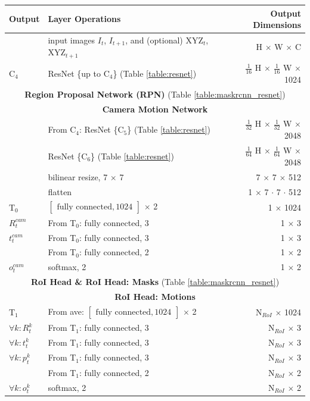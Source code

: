 {\begin{table}[h]
\centering
\begin{tabular}{llr}
\toprule
\textbf{Output} & \textbf{Layer Operations} & \textbf{Output Dimensions} \\
\midrule\midrule
& input images $I_t$, $I_{t+1}$, and (optional) XYZ$_{t}$, XYZ$_{t+1}$ & H $\times$ W $\times$ C \\
\midrule
C$_4$ & ResNet \{up to C$_4$\} (Table \ref{table:resnet}) & $\tfrac{1}{16}$ H $\times$ $\tfrac{1}{16}$ W $\times$ 1024 \\
\midrule
\multicolumn{3}{c}{\textbf{Region Proposal Network (RPN)} (Table \ref{table:maskrcnn_resnet})}\\
\midrule
\multicolumn{3}{c}{\textbf{Camera Motion Network}}\\
\midrule
& From C$_4$: ResNet \{C$_5$\} (Table \ref{table:resnet}) & $\tfrac{1}{32}$ H $\times$ $\tfrac{1}{32}$ W $\times$ 2048 \\
& ResNet \{C$_6$\} (Table \ref{table:resnet}) & $\tfrac{1}{64}$ H $\times$ $\tfrac{1}{64}$ W $\times$ 2048 \\
& bilinear resize, 7 $\times$ 7 & 7 $\times$ 7 $\times$ 512 \\
& flatten & 1 $\times$ 7 $\cdot$ 7 $\cdot$ 512 \\
T$_0$ & $\begin{bmatrix}\textrm{fully connected}, 1024\end{bmatrix}$ $\times$ 2  & 1 $\times$ 1024 \\

$R_t^{cam}$& From T$_0$: fully connected, 3 & 1 $\times$ 3 \\
$t_t^{cam}$& From T$_0$: fully connected, 3 & 1 $\times$ 3 \\
& From T$_0$: fully connected, 2 & 1 $\times$ 2 \\
$o_t^{cam}$& softmax, 2 & 1 $\times$ 2 \\
\midrule
\multicolumn{3}{c}{\textbf{RoI Head \& RoI Head: Masks} (Table \ref{table:maskrcnn_resnet})}\\
\midrule
\multicolumn{3}{c}{\textbf{RoI Head: Motions}}\\
\midrule
T$_1$ & From ave: $\begin{bmatrix}\textrm{fully connected}, 1024\end{bmatrix}$ $\times$ 2 & N$_{RoI}$ $\times$ 1024 \\
$\forall k: R_t^k$ & From T$_1$: fully connected, 3 & N$_{RoI}$ $\times$ 3 \\
$\forall k: t_t^k$ & From T$_1$: fully connected, 3 & N$_{RoI}$ $\times$ 3 \\
$\forall k: p_t^k$ & From T$_1$: fully connected, 3 & N$_{RoI}$ $\times$ 3 \\
& From T$_1$: fully connected, 2 & N$_{RoI}$ $\times$ 2 \\
$\forall k: o_t^k$ & softmax, 2 & N$_{RoI}$ $\times$ 2 \\


\end{tabular}
\end{table}}
